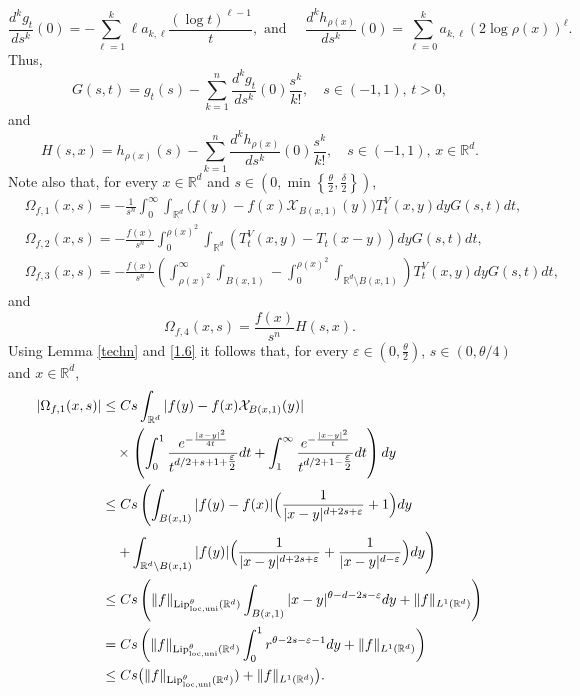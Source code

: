 \documentclass[10pt, a4paper, reqno]{amsart}
\theoremstyle{definition}
\theoremstyle{remark}
\numberwithin{equation}{section}
\begin{document}
\[
\frac{d^kg_t}{ds^k}(0)=-\sum_{\ell =1}^k\ell a_{k,\ell }\frac{(\log t)^{\ell -1}}{t}, \mbox{ and }\quad
\frac{d^kh_{\rho (x)}}{ds^k}(0)=\sum_{\ell =0}^ka_{k,\ell }(2\log \rho (x))^\ell.
\]
Thus,
\[
G(s,t)=g_t(s)-\sum_{k=1}^n\frac{d^kg_t}{ds^k}(0)\frac{s^k}{k!},\quad s\in (-1,1),\,t>0,
\]
and
\[
H(s,x)=h_{\rho (x)}(s)-\sum_{k=1}^n\frac{d^kh_{\rho (x)}}{ds^k}(0)\frac{s^k}{k!},\quad s\in (-1,1),\,x\in \mathbb R^d.
\]
Note also that, for every $x\in \mathbb R^d$ and $s\in (0,\min\left\{\tfrac{\theta}{2},\tfrac{\delta}{2}\right\})$,
\begin{align*}
    &\Omega_{f,1}(x,s)=-\frac{1}{s^n}\int_0^\infty\int_{\mathbb R^d}\big(f(y)-f(x)\mathcal X_{B(x,1)}(y)\big)T_t^V(x,y)dyG(s,t)dt,\\
    &\Omega_{f,2}(x,s)=-\frac{f(x)}{s^n}\int_0^{\rho (x)^2}\int_{\mathbb R^d}(T_t^V(x,y)-T_t(x-y))dyG(s,t)dt,\\
    &\Omega_{f,3}(x,s)=-\frac{f(x)}{s^n}\left(\int_{\rho (x)^2}^\infty\int_{B(x,1)}-\int_0^{\rho (x)^2}\int_{\mathbb R^d\setminus B(x,1)} \right)T_t^V(x,y)dyG(s,t)dt,
\end{align*}
and
\[
\Omega_{f,4}(x,s)=\frac{f(x)}{s^n}H(s,x).
\]
Using Lemma \ref{techn} and \eqref{1.6} it follows that, for every $\varepsilon \in (0,\tfrac{\theta}{2})$, $s\in (0,\theta /4)$ and $x\in \mathbb R^d$, 
\begin{align}\label{Omega1a}
 |\Omega_{f,1}(x,s)|&\leq Cs\int_{\mathbb R^d} |f(y)-f(x)\mathcal X_{B(x,1)}(y)|\nonumber\\
 &\quad \times \left(\int_0^1\frac{e^{-\frac{|x-y|^2}{4t}}}{t^{d/2+s+1+\tfrac{\varepsilon}{2}}}dt+\int_1^\infty \frac{e^{-\frac{|x-y|^2}{t}}}{t^{d/2+1-\tfrac{\varepsilon}{2}}}dt\right)dy\nonumber\\
 &\leq Cs\left(\int_{B(x,1)}|f(y)-f(x)|\Big(\frac{1}{|x-y|^{d+2s+\varepsilon}}+1\Big)dy\right.\nonumber\\
 &\quad \left.+\int_{\mathbb R^d\setminus B(x,1)}|f(y)|\Big(\frac{1}{|x-y|^{d+2s+\varepsilon}}+\frac{1}{|x-y|^{d-\varepsilon}}\Big)dy\right)\nonumber\\
 &\leq Cs\left(\|f\|_{{\textup{Lip}}^\theta_{\rm loc,uni}(\mathbb R^d)}\int_{B(x,1)}|x-y|^{\theta-d-2s-\varepsilon}dy+\|f\|_{L^1(\mathbb R^d)}\right)\nonumber\\
 &=Cs\left(\|f\|_{{\textup{Lip}}^\theta_{\rm loc,uni}(\mathbb R^d)}\int_0^1r^{\theta-2s-\varepsilon-1}dy+\|f\|_{L^1(\mathbb R^d)}\right)\nonumber\\
 &\leq Cs\big(\|f\|_{{\textup{Lip}}^\theta_{\rm loc,uni}(\mathbb R^d)})+\|f\|_{L^1(\mathbb R^d)}\big).
\end{align}
\end{document}
